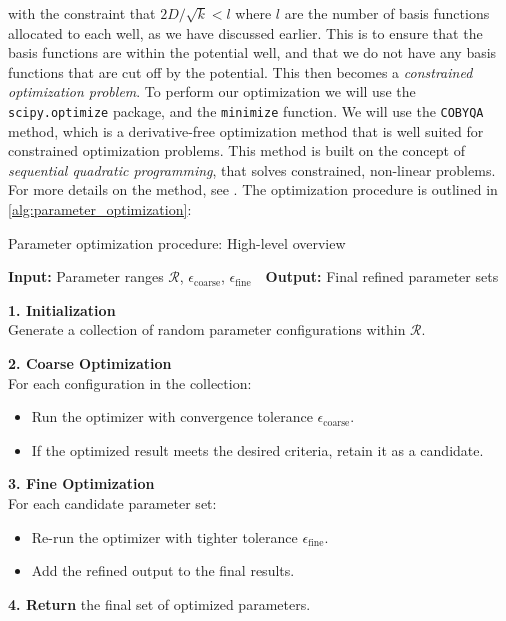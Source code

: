 \documentclass{subfiles}
\begin{document}
with the constraint that $2D / \sqrt{k} < l$ where $l$ are the number of basis functions allocated to each well, as we have discussed earlier. This is to ensure that the basis functions are within the potential well, and that we do not have any basis functions that are cut off by the potential. This then becomes a \emph{constrained optimization problem}. To perform our optimization we will use the \texttt{scipy.optimize} package, and the \texttt{minimize} function. We will use the \texttt{COBYQA} method, which is a derivative-free optimization method that is well suited for constrained optimization problems. This method is built on the concept of \emph{sequential quadratic programming}, that solves constrained, non-linear problems. For more details on the method, see \cite{razh_cobyqa}. The optimization procedure is outlined in \ref{alg:parameter_optimization}:
\begin{algorithm}[h!]
\caption{Parameter optimization procedure: High-level overview}
\textbf{Input: }{Parameter ranges \(\mathcal{R}\), \(\epsilon_{\text{coarse}}\), \(\epsilon_{\text{fine}}\)}
\,\,\,\,\textbf{Output: }{Final refined parameter sets}

\textbf{1. Initialization}\\
Generate a collection of random parameter configurations within \(\mathcal{R}\).

\textbf{2. Coarse Optimization}\\
For each configuration in the collection:
\begin{itemize}
  \item Run the optimizer with convergence tolerance \(\epsilon_{\text{coarse}}\).
  \item If the optimized result meets the desired criteria, retain it as a candidate.
\end{itemize}

\textbf{3. Fine Optimization}\\
For each candidate parameter set:
\begin{itemize}
  \item Re-run the optimizer with tighter tolerance \(\epsilon_{\text{fine}}\).
  \item Add the refined output to the final results.
\end{itemize}

\textbf{4. Return} the final set of optimized parameters.
\label{alg:parameter_optimization}
\end{algorithm}
\end{document}
